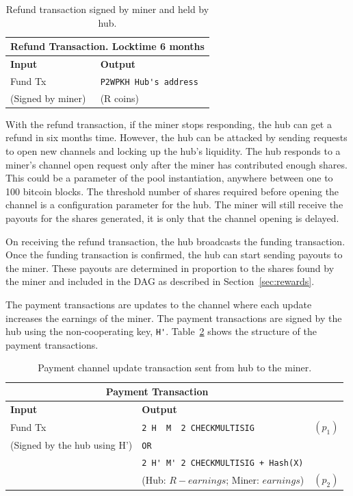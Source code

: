 \documentclass{article}
\begin{document}
\begin{table}
  \centering
  \begin{tabular}{ ll }
    \multicolumn{2}{c}{\bfseries Refund Transaction. Locktime 6 months} \\
    \midrule
    \bfseries Input & \bfseries Output \\
    \midrule
    Fund Tx & \verb|P2WPKH Hub's address| \\
    (Signed by miner) & (R coins) \\
    \midrule
  \end{tabular}
  \caption{Refund transaction signed by miner and held by
    hub.}\label{refund-tx}
\end{table}

With the refund transaction, if the miner stops responding, the hub
can get a refund in six months time. However, the hub can be attacked
by sending requests to open new channels and locking up the hub's
liquidity. The hub responds to a miner's channel open request only
after the miner has contributed enough shares. This could be a
parameter of the pool instantiation, anywhere between one to 100
bitcoin blocks. The threshold number of shares required before opening
the channel is a configuration parameter for the hub. The miner will
still receive the payouts for the shares generated, it is only that
the channel opening is delayed.

On receiving the refund transaction, the hub broadcasts the funding
transaction. Once the funding transaction is confirmed, the hub can
start sending payouts to the miner. These payouts are determined in
proportion to the shares found by the miner and included in the DAG as
described in Section~\ref{sec:rewards}.

The payment transactions are updates to the channel where each update
increases the earnings of the miner. The payment transactions are
signed by the hub using the non-cooperating key, \verb|H'|.
Table~\ref{payment-transaction} shows the structure of the payment
transactions.

\begin{table}
  \centering
  \begin{tabular}{ llr }
    \multicolumn{2}{c}{\bfseries Payment Transaction} \\
    \midrule
    \bfseries Input & \bfseries Output \\
    \midrule
    Fund Tx & \verb|2 H  M  2 CHECKMULTISIG| & $(p_1)$ \\
    (Signed by the hub using H') & \verb|OR| \\
                    & \verb|2 H' M' 2 CHECKMULTISIG + Hash(X)| \\
                    & (Hub: $R - earnings$; Miner: $earnings$) & $(p_2)$\\
    \midrule
  \end{tabular}
  \caption{Payment channel update transaction sent from hub to the
    miner.}\label{payment-transaction}
\end{table}
\end{document}
